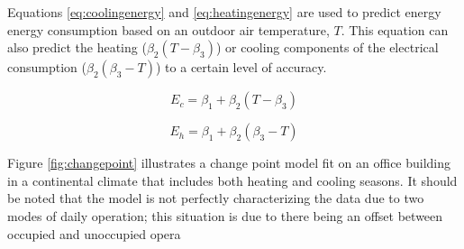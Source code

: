 Equations \ref{eq:coolingenergy} and \ref{eq:heatingenergy} are used to predict energy energy consumption based on an outdoor air temperature, $T$. This equation can also predict the heating ($\beta_2(T - \beta_3)$) or cooling components of the electrical consumption ($\beta_2(\beta_3 - T)$) to a certain level of accuracy. 

\begin{equation}
\label{eq:coolingenergy}
E_c = \beta_1 + \beta_2(T - \beta_3)
\end{equation}

\begin{equation}
\label{eq:heatingenergy}
E_h = \beta_1 + \beta_2(\beta_3 - T)
\end{equation}

Figure \ref{fig:changepoint} illustrates a change point model fit on an office building in a continental climate that includes both heating and cooling seasons. It should be noted that the model is not perfectly characterizing the data due to two modes of daily operation; this situation is due to there being an offset between occupied and unoccupied opera